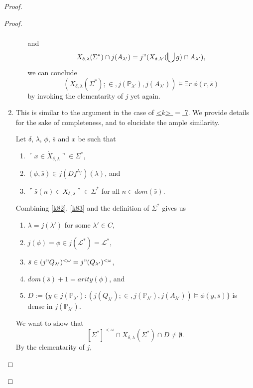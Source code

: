 \documentclass[12pt, twoside]{memoir}
\numberwithin{equation}{section}
\theoremstyle{definition}
\theoremstyle{remark}
\theoremstyle{definition}
\theoremstyle{definition}
\theoremstyle{definition}
\theoremstyle{remark}
\newcommand{\eq}{=}
\begin{document}
\begin{proof}
\begin{proof}
\begin{enumerate}[label=<$k$> $\eq$ \arabic* :, leftmargin=70pt]
\begin{enumerate}[label=Case \arabic*:, leftmargin=50pt]
\begin{align*}
        \end{align*}
        and
        \begin{align*}
            X_{\delta, \lambda}(\Sigma^*) \cap j(A_{\lambda'}) = j" (X_{\delta, \lambda'}(\bigcup g) \cap A_{\lambda'}),
        \end{align*}
        we can conclude $$(X_{\delta, \lambda}(\Sigma^*); \in, j(\mathbb{P}_{\lambda'}), j(A_{\lambda'})) \models \exists r \ \phi(r, \bar{s})$$ by invoking the elementarity of $j$ yet again.
    \end{enumerate}
    \item This is similar to the argument in the case of \hyperref[k7m]{<$k$> $\eq$ 7}. We provide details for the sake of completeness, and to elucidate the ample similarity. 
    
    Let $\delta$, $\lambda$, $\phi$, $\bar{s}$ and $x$ be such that 
    \begin{enumerate}[label=(K8.\arabic*), leftmargin=50pt]
        \item $\ulcorner x \in \dot{X}_{\delta, \lambda} \urcorner \in \Sigma^*$,
        \item\label{k82} $(\phi, \bar{s}) \in j(Df^{\lambda_f})(\lambda)$, and
        \item\label{k83} $\ulcorner \bar{s}(n) \in \dot{X}_{\delta, \lambda} \urcorner \in \Sigma^*$ for all $n \in dom(\bar{s})$.
    \end{enumerate}
    Combining \ref{k82}, \ref{k83} and the definition of $\Sigma^*$ gives us 
    \begin{enumerate}[label=(\alph*)]
        \item $\lambda = j(\lambda')$ for some $\lambda' \in C$,
        \item $j(\phi) = \phi \in j(\mathcal{L}^*) = \mathcal{L}^*$,
        \item $\bar{s} \in (j" Q_{\lambda'})^{< \omega} = j" (Q_{\lambda'})^{< \omega}$,
        \item $dom(\bar{s}) + 1 = arity(\phi)$, and
        \item $D := \{y \in j(\mathbb{P}_{\lambda'}) : (j(Q_{\lambda'}); \in, j(\mathbb{P}_{\lambda'}), j(A_{\lambda'})) \models \phi(y, \bar{s})\}$ is dense in $j(\mathbb{P}_{\lambda'})$.
    \end{enumerate}
    We want to show that $$[\Sigma^*]^{< \omega} \cap X_{\delta, \lambda}(\Sigma^*) \cap D \neq \emptyset.$$ By the elementarity of $j$, 
    \begin{enumerate}[label=(\alph*)]
        \setcounter{enumii}{5}

\end{enumerate}
\end{enumerate}
\end{proof}
\end{proof}
\end{document}
